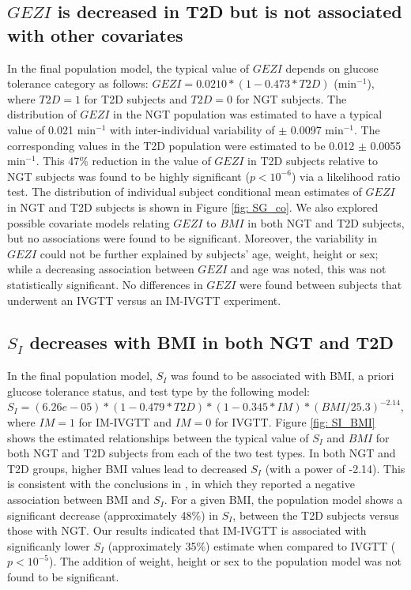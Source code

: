 \documentclass[utf8]{frontiersSCNS} %
\begin{document}
\vskip 0.5cm
\subsection{$GEZI$ is decreased in T2D but is not associated with other covariates}
In the final population model, the typical value of $GEZI$ depends on glucose tolerance category as follows: $GEZI=0.0210*(1-0.473*T2D)$ (min$^{-1}$), where $T2D=1$ for T2D subjects and $T2D=0$ for NGT subjects. The distribution of $GEZI$ in the NGT population was estimated to have a typical value of 0.021 min$^{-1}$  with inter-individual variability of $\pm$ 0.0097 min$^{-1}$. The corresponding values in the T2D population were estimated to be 0.012 $\pm$ 0.0055 min$^{-1}$. This 47\% reduction in the value of $GEZI$ in T2D subjects relative to NGT subjects was found to be highly significant ($p<10^{-6}$) via a likelihood ratio test. The distribution of individual subject conditional mean estimates of $GEZI$ in NGT and T2D subjects is shown in Figure \ref{fig: SG_co}. We also explored possible covariate models relating $GEZI$ to $BMI$ in both NGT and T2D subjects, but no associations were found to be significant. Moreover, the variability in $GEZI$ could not be further explained by subjects’ age, weight, height or sex; while a decreasing association between $GEZI$ and age was noted, this was not statistically significant. No differences in $GEZI$ were found between subjects that underwent an IVGTT versus an IM-IVGTT experiment.

\vskip 0.5cm
\subsection{$S_I$ decreases with BMI in both NGT and T2D}
In the final population model, $S_I$ was found to be associated with BMI, a priori glucose tolerance status, and test type by the following model: $S_I=(6.26e-05)*(1-0.479*T2D)*(1-0.345*IM)*(BMI/25.3)^{-2.14}$, where $IM=1$ for IM-IVGTT and $IM=0$ for IVGTT. Figure \ref{fig: SI_BMI} shows the estimated relationships between the typical value of $S_I$ and $BMI$ for both NGT and T2D subjects from each of the two test types. In both NGT and T2D groups, higher BMI values lead to decreased $S_I$ (with a power of -2.14). This is consistent with the conclusions in \citet{Bergman1997TheTolerance}, in which they reported a negative association between BMI and $S_I$. For a given BMI, the population model shows a significant decrease (approximately 48\%) in $S_I$, between the T2D subjects versus those with NGT. Our results indicated that IM-IVGTT is associated with significanly lower $S_I$ (approximately 35\%) estimate when compared to IVGTT ($p<10^{-5}$). The addition of weight, height or sex to the population model was not found to be significant.\\
\end{document}

